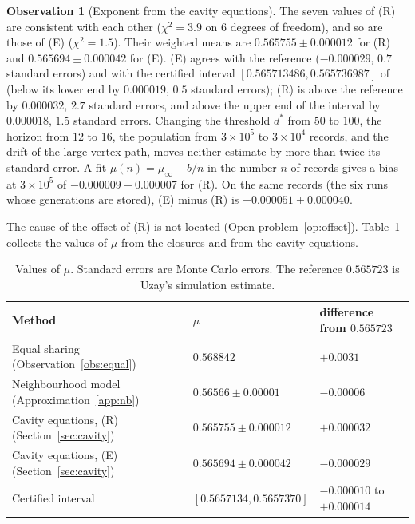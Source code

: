 \documentclass[11pt]{article}
\theoremstyle{plain}
\theoremstyle{definition}
\newtheorem{observation}[theorem]{Observation}
\theoremstyle{remark}
\begin{document}
\begin{observation}[Exponent from the cavity equations]\label{obs:cavity}
The seven values of (R) are consistent with each other ($\chi^2=3.9$ on $6$ degrees of freedom), and so are those of (E) ($\chi^2=1.5$). Their weighted means are $0.565755\pm0.000012$ for (R) and $0.565694\pm0.000042$ for (E). (E) agrees with the reference ($-0.000029$, $0.7$ standard errors) and with the certified interval $[0.565713486,0.565736987]$ of \cite{UzayR3} (below its lower end by $0.000019$, $0.5$ standard errors); (R) is above the reference by $0.000032$, $2.7$ standard errors, and above the upper end of the interval by $0.000018$, $1.5$ standard errors. Changing the threshold $d^*$ from $50$ to $100$, the horizon from $12$ to $16$, the population from $3\times10^5$ to $3\times10^4$ records, and the drift of the large-vertex path, moves neither estimate by more than twice its standard error. A fit $\mu(n)=\mu_\infty+b/n$ in the number $n$ of records gives a bias at $3\times10^5$ of $-0.000009\pm0.000007$ for (R). On the same records (the six runs whose generations are stored), (E) minus (R) is $-0.000051\pm0.000040$.
\end{observation}

The cause of the offset of (R) is not located (Open problem~\ref{op:offset}). Table~\ref{tab:values} collects the values of $\mu$ from the closures and from the cavity equations.

\begin{table}[H]
\centering
\begin{tabular}{lll}
\toprule
Method & $\mu$ & difference from $0.565723$\\
\midrule
Equal sharing (Observation~\ref{obs:equal}) & $0.568842$ & $+0.0031$\\
Neighbourhood model (Approximation~\ref{app:nb}) & $0.56566\pm0.00001$ & $-0.00006$\\
Cavity equations, (R) (Section~\ref{sec:cavity}) & $0.565755\pm0.000012$ & $+0.000032$\\
Cavity equations, (E) (Section~\ref{sec:cavity}) & $0.565694\pm0.000042$ & $-0.000029$\\
\midrule
Certified interval \cite{UzayR3} & $[0.5657134,0.5657370]$ & $-0.000010$ to $+0.000014$\\
\bottomrule
\end{tabular}
\caption{Values of $\mu$. Standard errors are Monte Carlo errors. The reference $0.565723$ is Uzay's simulation estimate.}\label{tab:values}
\end{table}
\end{document}
